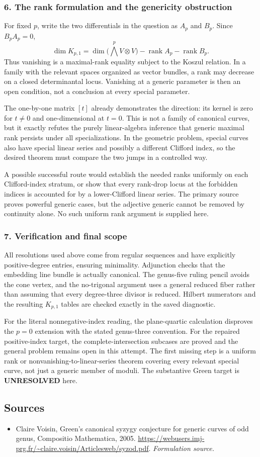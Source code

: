 \documentclass[11pt]{article}
\begin{document}
\subsubsection{6. The rank formulation and the genericity obstruction}
For fixed $p$, write the two differentials in the question as $A_p$ and $B_p$. Since $B_pA_p=0$,
\[
 \dim K_{p,1}
 =\dim\bigl(\textstyle\bigwedge^pV\otimes V\bigr)
   -\operatorname{rank}A_p-\operatorname{rank}B_p.      \tag{10}
\]
Thus vanishing is a maximal-rank equality subject to the Koszul relation. In a family with the relevant spaces organized as vector bundles, a rank may decrease on a closed determinantal locus. Vanishing at a generic parameter is then an open condition, not a conclusion at every special parameter.

The one-by-one matrix $[t]$ already demonstrates the direction: its kernel is zero for $t\ne0$ and one-dimensional at $t=0$. This is not a family of canonical curves, but it exactly refutes the purely linear-algebra inference that generic maximal rank persists under all specializations. In the geometric problem, special curves also have special linear series and possibly a different Clifford index, so the desired theorem must compare the two jumps in a controlled way.

A possible successful route would establish the needed ranks uniformly on each Clifford-index stratum, or show that every rank-drop locus at the forbidden indices is accounted for by a lower-Clifford linear series. The primary source proves powerful generic cases, but the adjective generic cannot be removed by continuity alone. No such uniform rank argument is supplied here.

\subsubsection{7. Verification and final scope}
All resolutions used above come from regular sequences and have explicitly positive-degree entries, ensuring minimality. Adjunction checks that the embedding line bundle is actually canonical. The genus-five ruling pencil avoids the cone vertex, and the no-trigonal argument uses a general reduced fiber rather than assuming that every degree-three divisor is reduced. Hilbert numerators and the resulting $K_{p,1}$ tables are checked exactly in the saved diagnostic.

For the literal nonnegative-index reading, the plane-quartic calculation disproves the $p=0$ extension with the stated genus-three convention. For the repaired positive-index target, the complete-intersection subcases are proved and the general problem remains open in this attempt. The first missing step is a uniform rank or nonvanishing-to-linear-series theorem covering every relevant special curve, not just a generic member of moduli. The substantive Green target is \textbf{UNRESOLVED} here.

\subsection{Sources}
\begin{itemize}
\item[S1]Claire Voisin, Green's canonical syzygy conjecture for generic curves of odd genus, Compositio Mathematica, 2005.
\url{https://webusers.imj-prg.fr/~claire.voisin/Articlesweb/syzod.pdf}.
\textit{Formulation source.}
\end{itemize}
\end{document}
